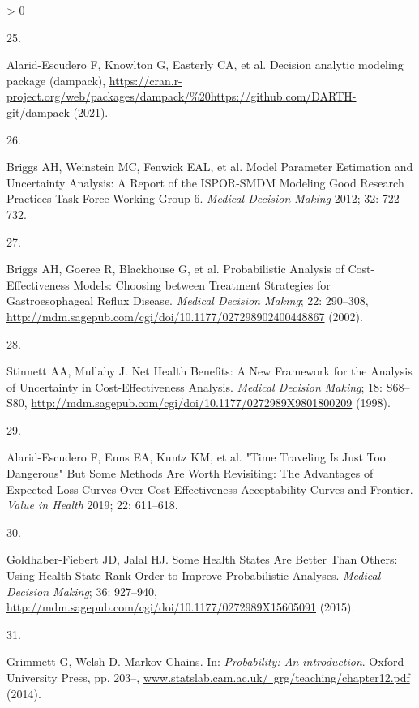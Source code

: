 \documentclass[
]{article}
\newlength{\cslhangindent}
\newlength{\csllabelwidth}
\newenvironment{CSLReferences}[2] %
 {%
  \setlength{\parindent}{0pt}
  \ifodd #1 \everypar{\setlength{\hangindent}{\cslhangindent}}\ignorespaces\fi
  \ifnum #2 > 0
  \setlength{\parskip}{#2\baselineskip}
  \fi
 }%
 {}
\newcommand{\CSLLeftMargin}[1]{\parbox[t]{\csllabelwidth}{#1}}
\newcommand{\CSLRightInline}[1]{\parbox[t]{\linewidth - \csllabelwidth}{#1}\break}
\begin{document}
\begin{CSLReferences}{0}{0}
\leavevmode\hypertarget{ref-Alarid-Escudero2021}{}%
\CSLLeftMargin{25. }
\CSLRightInline{Alarid-Escudero F, Knowlton G, Easterly CA, et al. Decision analytic modeling package (dampack), \url{https://cran.r-project.org/web/packages/dampack/\%20https://github.com/DARTH-git/dampack} (2021).}

\leavevmode\hypertarget{ref-Briggs2012}{}%
\CSLLeftMargin{26. }
\CSLRightInline{Briggs AH, Weinstein MC, Fenwick EAL, et al. {Model Parameter Estimation and Uncertainty Analysis: A Report of the ISPOR-SMDM Modeling Good Research Practices Task Force Working Group-6.} \emph{Medical Decision Making} 2012; 32: 722--732.}

\leavevmode\hypertarget{ref-Briggs2002}{}%
\CSLLeftMargin{27. }
\CSLRightInline{Briggs AH, Goeree R, Blackhouse G, et al. {Probabilistic Analysis of Cost-Effectiveness Models: Choosing between Treatment Strategies for Gastroesophageal Reflux Disease}. \emph{Medical Decision Making}; 22: 290--308, \url{http://mdm.sagepub.com/cgi/doi/10.1177/027298902400448867} (2002).}

\leavevmode\hypertarget{ref-Stinnett1998b}{}%
\CSLLeftMargin{28. }
\CSLRightInline{Stinnett AA, Mullahy J. {Net Health Benefits: A New Framework for the Analysis of Uncertainty in Cost-Effectiveness Analysis}. \emph{Medical Decision Making}; 18: S68--S80, \url{http://mdm.sagepub.com/cgi/doi/10.1177/0272989X9801800209} (1998).}

\leavevmode\hypertarget{ref-Alarid-Escudero2019}{}%
\CSLLeftMargin{29. }
\CSLRightInline{Alarid-Escudero F, Enns EA, Kuntz KM, et al. {"Time Traveling Is Just Too Dangerous" But Some Methods Are Worth Revisiting: The Advantages of Expected Loss Curves Over Cost-Effectiveness Acceptability Curves and Frontier}. \emph{Value in Health} 2019; 22: 611--618.}

\leavevmode\hypertarget{ref-Goldhaber-Fiebert2015}{}%
\CSLLeftMargin{30. }
\CSLRightInline{Goldhaber-Fiebert JD, Jalal HJ. {Some Health States Are Better Than Others: Using Health State Rank Order to Improve Probabilistic Analyses}. \emph{Medical Decision Making}; 36: 927--940, \url{http://mdm.sagepub.com/cgi/doi/10.1177/0272989X15605091} (2015).}

\leavevmode\hypertarget{ref-Grimmett2014}{}%
\CSLLeftMargin{31. }
\CSLRightInline{Grimmett G, Welsh D. {Markov Chains}. In: \emph{Probability: An introduction}. Oxford University Press, pp. 203--, \href{https://www.statslab.cam.ac.uk/\%C2\%A0grg/teaching/chapter12.pdf}{www.statslab.cam.ac.uk/~grg/teaching/chapter12.pdf} (2014).}


\end{CSLReferences}
\end{document}
